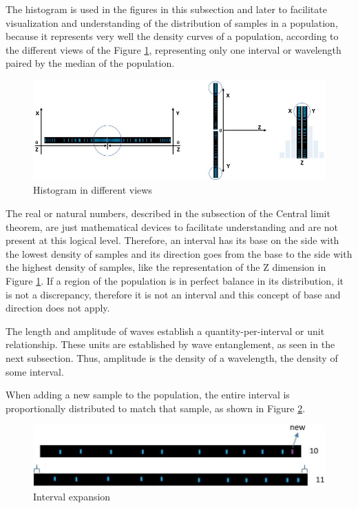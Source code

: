 The histogram is used in the figures in this subsection and later to facilitate visualization and understanding of the distribution of samples in a population, because it represents very well the density curves of a population, according to the different views of the Figure \ref{fig:consciousness_wave_histogram}, representing only one interval or wavelength paired by the median of the population.  
	\begin{figure}[H]
	\caption{Histogram in different views}
	\label{fig:consciousness_wave_histogram}
	\centering
	\includegraphics[scale=.7]{sections/images/consciousness_wave_histogram.jpg}
	\end{figure}

The real or natural numbers, described in the subsection of the Central limit theorem, are just mathematical devices to facilitate understanding and are not present at this logical level. Therefore, an interval has its base on the side with the lowest density of samples and its direction goes from the base to the side with the highest density of samples, like the representation of the Z dimension in Figure \ref{fig:consciousness_wave_histogram}. If a region of the population is in perfect balance in its distribution, it is not a discrepancy, therefore it is not an interval and this concept of base and direction does not apply.
	
The length and amplitude of waves establish a quantity-per-interval or unit relationship. These units are established by wave entanglement, as seen in the next subsection. Thus, amplitude is the density of a wavelength, the density of some interval.  

When adding a new sample to the population, the entire interval is proportionally distributed to match that sample, as shown in Figure \ref{fig:consciousness_space_volume_amplitude}.
	\begin{figure}[H]
	\caption{Interval expansion}
	\label{fig:consciousness_space_volume_amplitude}
	\centering
	\includegraphics[scale=.5]{sections/images/consciousness_space_volume_amplitude.jpg}
	\end{figure}
	
